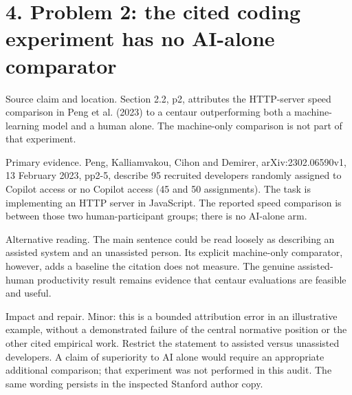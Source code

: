 \documentclass[10pt]{article}
\begin{document}
\section*{4. Problem 2: the cited coding experiment has no AI-alone comparator}
Source claim and location. Section 2.2, p2, attributes the HTTP-server speed comparison in Peng et al. (2023) to a centaur outperforming both a machine-learning model and a human alone. The machine-only comparison is not part of that experiment.\par
Primary evidence. Peng, Kalliamvakou, Cihon and Demirer, arXiv:2302.06590v1, 13 February 2023, pp2-5, describe 95 recruited developers randomly assigned to Copilot access or no Copilot access (45 and 50 assignments). The task is implementing an HTTP server in JavaScript. The reported speed comparison is between those two human-participant groups; there is no AI-alone arm.\par
Alternative reading. The main sentence could be read loosely as describing an assisted system and an unassisted person. Its explicit machine-only comparator, however, adds a baseline the citation does not measure. The genuine assisted-human productivity result remains evidence that centaur evaluations are feasible and useful.\par
Impact and repair. Minor: this is a bounded attribution error in an illustrative example, without a demonstrated failure of the central normative position or the other cited empirical work. Restrict the statement to assisted versus unassisted developers. A claim of superiority to AI alone would require an appropriate additional comparison; that experiment was not performed in this audit. The same wording persists in the inspected Stanford author copy.\par
\end{document}
